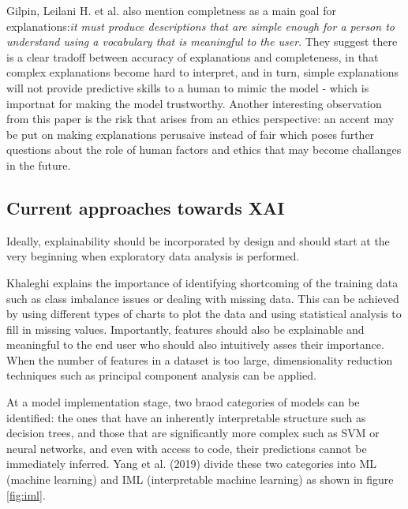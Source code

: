 \documentclass[proposal]{softeng}
\begin{document}
Gilpin, Leilani H. et al.\cite{GilpinLeilaniH} also mention completness as a main goal for explanations:\textit{it must produce descriptions that are simple enough for a person to understand using a vocabulary that is meaningful to the user}. They suggest there is a clear tradoff between accuracy of explanations and completeness, in that complex explanations become hard to interpret, and in turn, simple explanations will not provide predictive skills to a human to mimic the model - which is importnat for making the model trustworthy. Another interesting observation from this paper is the risk that arises from an ethics perspective: an accent may be put on making explanations perusaive instead of fair which poses further questions about the role of human factors and ethics that may become challanges in the future.

\subsection{Current approaches towards XAI}
Ideally, explainability should be incorporated by design and should start at the very beginning when exploratory data analysis is performed. 

Khaleghi \cite{khaleghi} explains the importance of identifying shortcoming of the training data such as class imbalance issues or dealing with missing data. This can be achieved by using different types of charts to plot the data and using statistical analysis to fill in missing values. Importantly, features should also be explainable and meaningful to the end user who should also intuitively asses their importance. When the number of features in a dataset is too large, dimensionality reduction techniques such as principal component analysis can be applied.

At a model implementation stage, two braod categories of models can be identified: the ones that have an inherently interpretable structure such as decision trees, and those that are significantly more complex such as SVM or neural networks, and even with access to code, their predictions cannot be immediately inferred. Yang et al. (2019) \cite{YangFan2019EEWG} divide these two categories into ML (machine learning) and IML (interpretable machine learning) as shown in figure \ref{fig:iml}. 
\end{document}
